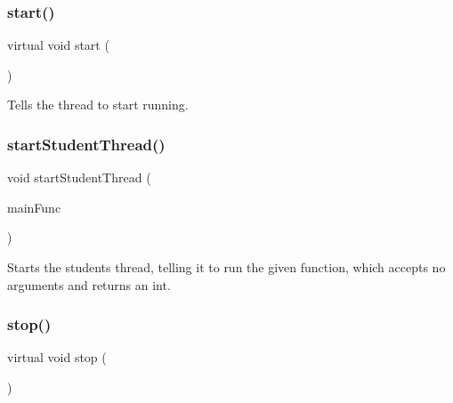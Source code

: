\subsubsection{\texorpdfstring{start()}{start()}}
{\footnotesize\ttfamily virtual void start (\begin{DoxyParamCaption}{ }\end{DoxyParamCaption})\hspace{0.3cm}{\ttfamily [pure virtual]}}



Tells the thread to start running. 

\mbox{\label{classsgl_1_1GThread_a7d68a5d8a6557bb824cf2568240a1aef}} 
\subsubsection{\texorpdfstring{start\+Student\+Thread()}{startStudentThread()}}
{\footnotesize\ttfamily void start\+Student\+Thread (\begin{DoxyParamCaption}\item[{\mbox{\hyperlink{namespacesgl_a2c46348e6e6dbf761bcceddb93945ac3}{G\+Thunk\+Int}}}]{main\+Func }\end{DoxyParamCaption})\hspace{0.3cm}{\ttfamily [static]}}



Starts the student\textquotesingle{}s thread, telling it to run the given function, which accepts no arguments and returns an int. 

\mbox{\label{classsgl_1_1GThread_a0efff8623a2fb79dad94a96dcf16d966}} 
\subsubsection{\texorpdfstring{stop()}{stop()}}
{\footnotesize\ttfamily virtual void stop (\begin{DoxyParamCaption}{ }\end{DoxyParamCaption})\hspace{0.3cm}{\ttfamily [pure virtual]}}



